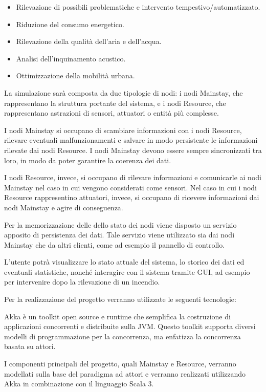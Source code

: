 \documentclass[12pt]{article}
\begin{document}
\begin{itemize}
    \item Rilevazione di possibili problematiche e intervento tempestivo/automatizzato.
    \item Riduzione del consumo energetico.
    \item Rilevazione della qualità dell'aria e dell'acqua.
    \item Analisi dell'inquinamento acustico.
    \item Ottimizzazione della mobilità urbana.
\end{itemize}

La simulazione sarà composta da due tipologie di nodi: i nodi Mainstay, che rappresentano la struttura portante del sistema, e i nodi Resource, che rappresentano astrazioni di sensori, attuatori o entità più complesse.

I nodi Mainstay si occupano di scambiare informazioni con i nodi Resource, rilevare eventuali malfunzionamenti e salvare in modo persistente le informazioni rilevate dai nodi Resource. I nodi Mainstay devono essere sempre sincronizzati tra loro, in modo da poter garantire la coerenza dei dati.

I nodi Resource, invece, si occupano di rilevare informazioni e comunicarle ai nodi Mainstay nel caso in cui vengono considerati come sensori. Nel caso in cui i nodi Resource rappresentino attuatori, invece, si occupano di ricevere informazioni dai nodi Mainstay e agire di conseguenza.

Per la memorizzazione delle dello stato dei nodi viene disposto un servizio apposito di persistenza dei dati. Tale servizio viene utilizzato sia dai nodi Mainstay che da altri clienti, come ad esempio il pannello di controllo.

L'utente potrà visualizzare lo stato attuale del sistema, lo storico dei dati ed eventuali statistiche, nonché interagire con il sistema tramite GUI, ad esempio per intervenire dopo la rilevazione di un incendio.

Per la realizzazione del progetto verranno utilizzate le seguenti tecnologie:

Akka è un toolkit open source e runtime che semplifica la costruzione di applicazioni concorrenti e distribuite sulla JVM. Questo toolkit supporta diversi modelli di programmazione per la concorrenza, ma enfatizza la concorrenza basata su attori.

I componenti principali del progetto, quali Mainstay e Resource, verranno modellati sulla base del paradigma ad attori e verranno realizzati utilizzando Akka in combinazione con il linguaggio Scala 3.
\end{document}
